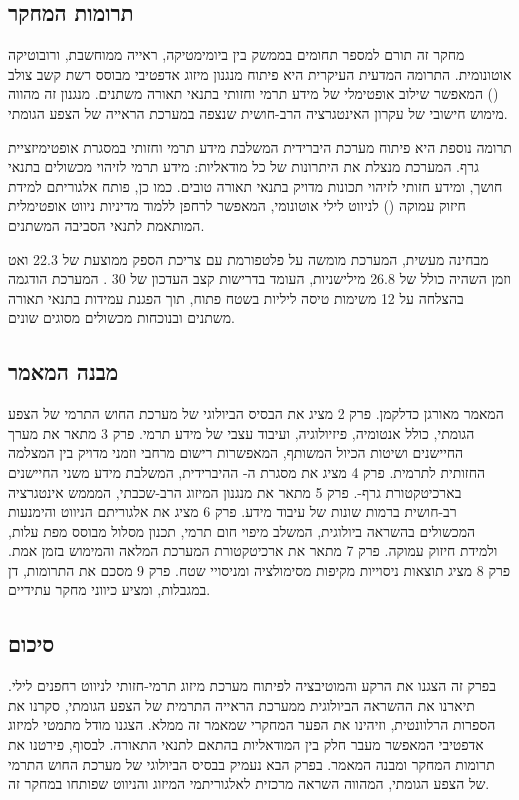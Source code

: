 \subsection{תרומות המחקר}
\label{sec:ch01_contributions}

מחקר זה תורם למספר תחומים בממשק בין ביומימטיקה, ראייה ממוחשבת, ורובוטיקה אוטונומית. התרומה המדעית העיקרית היא פיתוח מנגנון מיזוג אדפטיבי מבוסס רשת קשב צולב () המאפשר שילוב אופטימלי של מידע תרמי וחזותי בתנאי תאורה משתנים. מנגנון זה מהווה מימוש חישובי של עקרון האינטגרציה הרב-חושית שנצפה במערכת הראייה של הצפע הגומתי.

תרומה נוספת היא פיתוח מערכת  היברידית המשלבת מידע תרמי וחזותי במסגרת אופטימיזציית גרף. המערכת מנצלת את היתרונות של כל מודאליות: מידע תרמי לזיהוי מכשולים בתנאי חושך, ומידע חזותי לזיהוי תכונות מדויק בתנאי תאורה טובים. כמו כן, פותח אלגוריתם למידת חיזוק עמוקה () לניווט לילי אוטונומי, המאפשר לרחפן ללמוד מדיניות ניווט אופטימלית המותאמת לתנאי הסביבה המשתנים.

מבחינה מעשית, המערכת מומשה על פלטפורמת  עם צריכת הספק ממוצעת של 22.3 ואט וזמן השהיה כולל של 26.8 מילישניות, העומד בדרישות קצב העדכון של 30 . המערכת הודגמה בהצלחה על 12 משימות טיסה ליליות בשטח פתוח, תוך הפגנת עמידות בתנאי תאורה משתנים ובנוכחות מכשולים מסוגים שונים.

\subsection{מבנה המאמר}
\label{sec:ch01_structure}

המאמר מאורגן כדלקמן. פרק 2 מציג את הבסיס הביולוגי של מערכת החוש התרמי של הצפע הגומתי, כולל אנטומיה, פיזיולוגיה, ועיבוד עצבי של מידע תרמי. פרק 3 מתאר את מערך החיישנים ושיטות הכיול המשותף, המאפשרות רישום מרחבי וזמני מדויק בין המצלמה החזותית לתרמית. פרק 4 מציג את מסגרת ה- ההיברידית, המשלבת מידע משני החיישנים בארכיטקטורת גרף-. פרק 5 מתאר את מנגנון המיזוג הרב-שכבתי, המממש אינטגרציה רב-חושית ברמות שונות של עיבוד מידע. פרק 6 מציג את אלגוריתם הניווט והימנעות המכשולים בהשראה ביולוגית, המשלב מיפוי חום תרמי, תכנון מסלול מבוסס מפת עלות, ולמידת חיזוק עמוקה. פרק 7 מתאר את ארכיטקטורת המערכת המלאה והמימוש בזמן אמת. פרק 8 מציג תוצאות ניסוייות מקיפות מסימולציה ומניסויי שטח. פרק 9 מסכם את התרומות, דן במגבלות, ומציע כיווני מחקר עתידיים.

\subsection{סיכום}
\label{sec:ch01_summary}

בפרק זה הצגנו את הרקע והמוטיבציה לפיתוח מערכת מיזוג תרמי-חזותי לניווט רחפנים לילי. תיארנו את ההשראה הביולוגית ממערכת הראייה התרמית של הצפע הגומתי, סקרנו את הספרות הרלוונטית, וזיהינו את הפער המחקרי שמאמר זה ממלא. הצגנו מודל מתמטי למיזוג אדפטיבי המאפשר מעבר חלק בין המודאליות בהתאם לתנאי התאורה. לבסוף, פירטנו את תרומות המחקר ומבנה המאמר. בפרק הבא נעמיק בבסיס הביולוגי של מערכת החוש התרמי של הצפע הגומתי, המהווה השראה מרכזית לאלגוריתמי המיזוג והניווט שפותחו במחקר זה.
